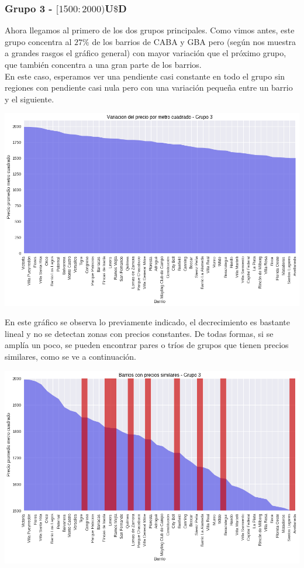 \documentclass[a4paper, 10pt]{article}
\newcommand\tab[1][0.5cm]{\hspace*{#1}}
\begin{document}
				\subsubsection{Grupo 3 - $[1500:2000)$U$\$$D}
					Ahora llegamos al primero de los dos grupos principales. Como vimos antes, este grupo concentra al $27\%$ de
					los barrios de CABA y GBA pero (según nos muestra a grandes rasgos el gráfico general) con mayor variación
					que el próximo grupo, que también concentra a una gran parte de los barrios.\\
					\tab En este caso, esperamos ver una pendiente casi constante en todo el grupo sin regiones con pendiente
					casi nula pero con una variación pequeña entre un barrio y el siguiente.
					\begin{center}
   		    				\includegraphics[width=\textwidth]{images/m2Group3Area}
				  	\end{center}
				  	\tab En este gráfico se observa lo previamente indicado, el decrecimiento es bastante lineal y no se detectan
				  	zonas con precios constantes. De todas formas, si se amplía un poco, se pueden encontrar pares o tríos de grupos
				  	que tienen precios similares, como se ve a continuación.
				  	\begin{center}
   		    				\includegraphics[width=\textwidth]{images/m2Group3Detail}
				  	\end{center}
\end{document}
